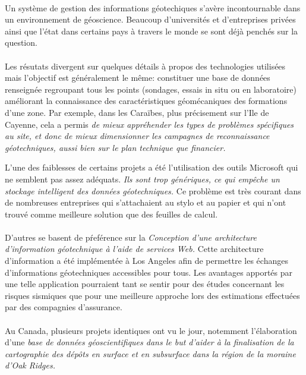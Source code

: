 \paragraph{}
Un système de gestion des informations géotechiques s'avère incontournable
dans un environnement de géoscience. Beaucoup d'universités et d'entreprises 
privées ainsi que l'état dans certains pays à travers le monde se sont déjà 
penchés sur la question. 
\paragraph{}
Les résutats divergent sur quelques détails à propos des technologies utilisées mais 
l'objectif est généralement le même: 
constituer une base de données renseignée regroupant tous les points (sondages, essais
in situ ou en laboratoire) améliorant la connaissance des caractéristiques géomécaniques des
formations d'une zone.
Par exemple, dans les Caraïbes, plus précisement sur l'Ile de Cayenne, cela a permis
\textit{ de mieux appréhender les types de problèmes
spécifiques au site, et donc de mieux dimensionner les campagnes de reconnaissance
géotechniques, aussi bien sur le plan technique que financier.}
\cite{Cayenne}
\par
L'une des faiblesses de certains projets a été l'utilisation des outils Microsoft
qui ne semblent pas assez 
adéquats. \textit{Ils sont trop génériques, ce qui empêche un stockage intelligent des données géotechniques.}
\cite{antoljak2012subsurface}
Ce problème est très courant dans de nombreuses entreprises qui s'attachaient au stylo et au papier
et qui n'ont trouvé comme meilleure solution que des feuilles de calcul.


\paragraph{}D'autres se basent de pŕeférence sur la \textit{Conception d'une architecture d'information 
géotechnique à l'aide de services Web.}
\cite{zimmermann2003design}
Cette architecture d'information a été implémentée à Los Angeles afin de permettre les échanges 
d'informations géotechniques accessibles pour tous. Les avantages apportés par une telle 
application pourraient tant se sentir pour des études concernant les risques sismiques que pour 
une meilleure approche lors des estimations effectuées par des compagnies d'assurance. 

\paragraph{}
Au Canada, plusieurs projets identiques ont vu le jour, notemment l'élabora\-tion d'une \textit{base 
de données géoscientifiques dans le but d’aider à la finalisation de la 
cartographie des dépôts en surface et en subsurface dans la région de la moraine d’Oak 
Ridges.}
\cite{russell1996regional}

